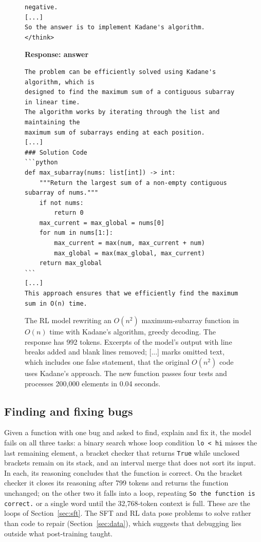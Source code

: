 \documentclass[sigconf,nonacm,balance=false]{acmart}
\begin{document}
\begin{figure}
\begin{minipage}[t]{0.49\textwidth}
\begin{verbatim}
negative.
[...]
So the answer is to implement Kadane's algorithm.
</think>
\end{verbatim}
  \end{minipage}\hfill
  \begin{minipage}[t]{0.49\textwidth}
    \scriptsize
    \textbf{Response: answer}\vspace{-0.5em}
\begin{verbatim}
The problem can be efficiently solved using Kadane's algorithm, which is
designed to find the maximum sum of a contiguous subarray in linear time.
The algorithm works by iterating through the list and maintaining the
maximum sum of subarrays ending at each position.
[...]
### Solution Code
```python
def max_subarray(nums: list[int]) -> int:
    """Return the largest sum of a non-empty contiguous subarray of nums."""
    if not nums:
        return 0
    max_current = max_global = nums[0]
    for num in nums[1:]:
        max_current = max(num, max_current + num)
        max_global = max(max_global, max_current)
    return max_global
```
[...]
This approach ensures that we efficiently find the maximum sum in O(n) time.
\end{verbatim}
  \end{minipage}
  \caption{The RL model rewriting an $O(n^2)$ maximum-subarray function in $O(n)$ time with Kadane's algorithm, greedy
  decoding. The response has 992 tokens. Excerpts of the model's output with line breaks added and blank lines
  removed; [...] marks omitted text, which includes one false statement, that the original $O(n^2)$ code uses Kadane's
  approach. The new function passes four tests and processes 200,000 elements in 0.04 seconds.}
  \label{fig:optimize}
\end{figure}

\subsection{Finding and fixing bugs}

Given a function with one bug and asked to find, explain and fix it, the model fails on all three tasks: a binary
search whose loop condition \texttt{lo < hi} misses the last remaining element, a bracket checker that returns
\texttt{True} while unclosed brackets remain on its stack, and an interval merge that does not sort its input. In each,
its reasoning concludes that the function is correct. On the bracket checker it closes its reasoning after 799 tokens
and returns the function unchanged; on the other two it falls into a loop, repeating \texttt{So the function is
correct.} or a single word until the 32,768-token context is full. These are the loops of Section~\ref{sec:sft}. The
SFT and RL data pose problems to solve rather than code to repair (Section~\ref{sec:data}), which suggests that
debugging lies outside what post-training taught.
\end{document}
